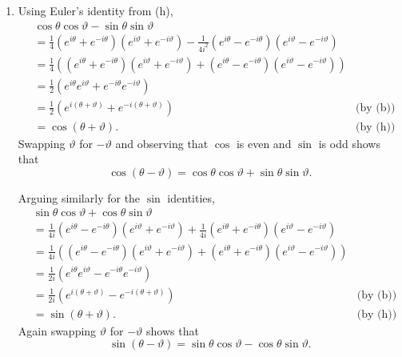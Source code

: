 \documentclass[oneside]{article}
\begin{document}
\begin{enumerate}[label=\textbf{\arabic*.}]
\begin{enumerate}[label=\textbf{(\alph*)}]
    \item Using Euler's identity from (h),\begin{align*}
      &\cos\theta\cos\vartheta - \sin\theta\sin\vartheta \\
      &= \frac14
        \left(e^{i\theta} + e^{-i\theta}\right)
        \left(e^{i\vartheta} + e^{-i\vartheta}\right)
        - \frac1{4i^2}
        \left(e^{i\theta} - e^{-i\theta}\right)
        \left(e^{i\vartheta} - e^{-i\vartheta}\right) \\
      &= \frac14\left(
        \left(e^{i\theta} + e^{-i\theta}\right)
        \left(e^{i\vartheta} + e^{-i\vartheta}\right)
        + \left(e^{i\theta} - e^{-i\theta}\right)
        \left(e^{i\vartheta} - e^{-i\vartheta}\right)\right) \\
      &= \frac12\left(
        e^{i\theta}e^{i\vartheta}
        + e^{-i\theta}e^{-i\vartheta}
        \right) \\
      &= \frac12\left(
        e^{i(\theta + \vartheta)} + e^{-i(\theta + \vartheta)}
        \right)  & \text{(by (b))} \\
      &= \cos(\theta + \vartheta) \text{.} & \text{(by (h))}
    \end{align*} Swapping $\vartheta$ for $-\vartheta$ and observing that
    $\cos$ is even and $\sin$ is odd shows that \[
      \cos(\theta  - \vartheta)
      = \cos\theta\cos\vartheta + \sin\theta\sin\vartheta \text{.}
    \]

    Arguing similarly for the $\sin$ identities,\begin{align*}
      &\sin\theta\cos\vartheta + \cos\theta\sin\vartheta \\
      &= \frac1{4i}
        \left(e^{i\theta} - e^{-i\theta}\right)
        \left(e^{i\vartheta} + e^{-i\vartheta}\right)
        + \frac1{4i}
        \left(e^{i\theta} + e^{-i\theta}\right)
        \left(e^{i\vartheta} - e^{-i\vartheta}\right) \\
      &= \frac1{4i}\left(
        \left(e^{i\theta} - e^{-i\theta}\right)
        \left(e^{i\vartheta} + e^{-i\vartheta}\right)
        + \left(e^{i\theta} + e^{-i\theta}\right)
        \left(e^{i\vartheta} - e^{-i\vartheta}\right)\right) \\
      &= \frac1{2i}\left(
        e^{i\theta}e^{i\vartheta}
        - e^{-i\theta}e^{-i\vartheta}
        \right) \\
      &= \frac1{2i}\left(
        e^{i(\theta + \vartheta)} - e^{-i(\theta + \vartheta)}
        \right)  & \text{(by (b))} \\
      &= \sin(\theta + \vartheta) \text{.} & \text{(by (h))}
    \end{align*} Again swapping $\vartheta$ for $-\vartheta$ shows that \[
      \sin(\theta  - \vartheta)
      = \sin\theta\cos\vartheta - \cos\theta\sin\vartheta \text{.}
    \]


\end{enumerate}
\end{enumerate}
\end{document}
